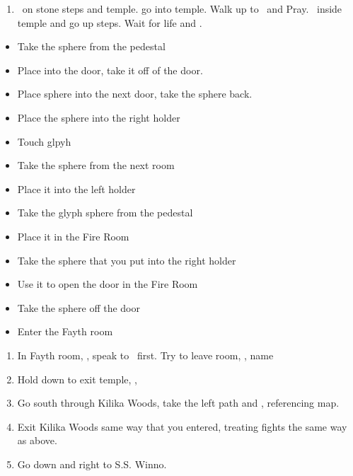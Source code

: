 \begin{enumerate}[resume]
  \item \sd\ on stone steps and temple. go into temple. Walk up to \wakka\ and Pray. \sd\ inside temple and go up steps. Wait for life and \sd.
\end{enumerate}
\begin{trial}
  \begin{itemize}
    \item Take the sphere from the pedestal
    \item Place into the door, take it off of the door.
    \item Place sphere into the next door, take the sphere back.
    \item Place the sphere into the right holder
    \item Touch glpyh
    \item Take the sphere from the next room
    \item Place it into the left holder
    \item Take the glyph sphere from the pedestal
    \item Place it in the Fire Room
    \item Take the sphere that you put into the right holder
    \item Use it to open the door in the Fire Room
    \item Take the sphere off the door
    \item Enter the Fayth room
  \end{itemize}
\end{trial}
\begin{enumerate}[resume]
  \item In Fayth room, \sd, speak to \wakka\ first. Try to leave room, \sd, name \ifrit
  \item Hold down to exit temple, \cs[0:40], \sd
  \item Go south through Kilika Woods, take the left path and , referencing map.
  \item Exit Kilika Woods same way that you entered, treating fights the same way as above.
  \item Go down and right to S.S. Winno. \sd
\end{enumerate}